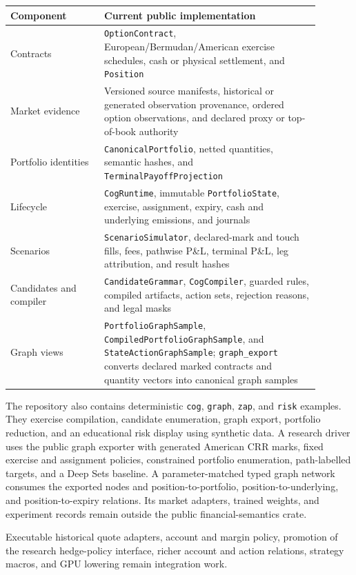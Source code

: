 \documentclass{strategynet-journal}
\begin{document}
\begin{center}
\begin{tabular}{@{}P{0.27\linewidth}P{0.62\linewidth}@{}}
\toprule
Component & Current public implementation \\
\midrule
Contracts &
\texttt{OptionContract}, European/Bermudan/American exercise schedules,
cash or physical settlement, and \texttt{Position} \\
Market evidence &
Versioned source manifests, historical or generated observation provenance,
ordered option observations, and declared proxy or top-of-book authority \\
Portfolio identities &
\texttt{CanonicalPortfolio}, netted quantities, semantic hashes, and
\texttt{TerminalPayoffProjection} \\
Lifecycle &
\texttt{CogRuntime}, immutable \texttt{PortfolioState}, exercise,
assignment, expiry, cash and underlying emissions, and journals \\
Scenarios &
\texttt{ScenarioSimulator}, declared-mark and touch fills, fees, pathwise
P\&L, terminal P\&L, leg attribution, and result hashes \\
Candidates and compiler &
\texttt{CandidateGrammar}, \texttt{CogCompiler}, guarded rules, compiled
artifacts, action sets, rejection reasons, and legal masks \\
Graph views &
\texttt{PortfolioGraphSample}, \texttt{CompiledPortfolioGraphSample}, and
\texttt{StateActionGraphSample}; \texttt{graph\_export} converts declared
marked contracts and quantity vectors into canonical graph samples \\
\bottomrule
\end{tabular}
\end{center}

The repository also contains deterministic \texttt{cog}, \texttt{graph},
\texttt{zap}, and \texttt{risk} examples.  They exercise compilation,
candidate enumeration, graph export, portfolio reduction, and an educational
risk display using synthetic data.  A research driver uses the public graph
exporter with generated American CRR marks, fixed exercise and assignment
policies, constrained portfolio enumeration, path-labelled targets, and a
Deep Sets baseline.  A parameter-matched typed graph network consumes the
exported nodes and position-to-portfolio, position-to-underlying, and
position-to-expiry relations.  Its market adapters, trained weights, and
experiment records remain outside the public financial-semantics crate.

Executable historical quote adapters, account and margin policy, promotion of
the research hedge-policy interface, richer account and action relations,
strategy macros, and GPU lowering remain integration work.
\end{document}
